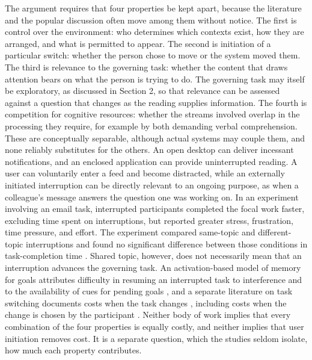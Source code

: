 \documentclass[12pt]{article}
\begin{document}
The argument requires that four properties be kept apart, because the literature and the popular discussion often move among them without notice. The first is control over the environment: who determines which contexts exist, how they are arranged, and what is permitted to appear. The second is initiation of a particular switch: whether the person chose to move or the system moved them. The third is relevance to the governing task: whether the content that draws attention bears on what the person is trying to do. The governing task may itself be exploratory, as discussed in Section 2, so that relevance can be assessed against a question that changes as the reading supplies information. The fourth is competition for cognitive resources: whether the streams involved overlap in the processing they require, for example by both demanding verbal comprehension. These are conceptually separable, although actual systems may couple them, and none reliably substitutes for the others. An open desktop can deliver incessant notifications, and an enclosed application can provide uninterrupted reading. A user can voluntarily enter a feed and become distracted, while an externally initiated interruption can be directly relevant to an ongoing purpose, as when a colleague's message answers the question one was working on. In an experiment involving an email task, interrupted participants completed the focal work faster, excluding time spent on interruptions, but reported greater stress, frustration, time pressure, and effort. The experiment compared same-topic and different-topic interruptions and found no significant difference between those conditions in task-completion time \cite{mark2008cost}. Shared topic, however, does not necessarily mean that an interruption advances the governing task. An activation-based model of memory for goals attributes difficulty in resuming an interrupted task to interference and to the availability of cues for pending goals \cite{altmann2002memory}, and a separate literature on task switching documents costs when the task changes \cite{monsell2003task}, including costs when the change is chosen by the participant \cite{arrington2004voluntary}. Neither body of work implies that every combination of the four properties is equally costly, and neither implies that user initiation removes cost. It is a separate question, which the studies seldom isolate, how much each property contributes.
\end{document}
